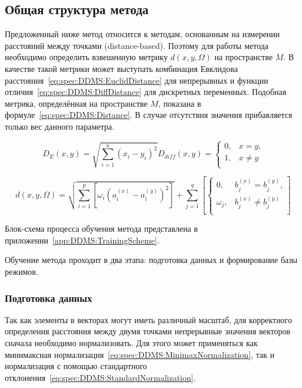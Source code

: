 \subsection{Общая структура метода}
Предложенный ниже метод относится к методам, основанным на измерении расстояний между точками (distance-based). Поэтому для работы метода необходимо определить взвешенную метрику $d(x,y,\Omega)$ на пространстве $M$. В качестве такой метрики может выступать комбинация Евклидова расстояния~\eqref{eq:spec:DDMS:EuclidDistance} для непрерывных и функции отличия~\eqref{eq:spec:DDMS:DiffDistance} для дискретных переменных. Подобная метрика, определённая на пространстве $M$, показана в формуле~\eqref{eq:spec:DDMS:Distance}. В случае отсутствия значения прибавляется только вес данного параметра.

\begin{subequations}
\begin{equation} \label{eq:spec:DDMS:EuclidDistance}
D_E(x,y) = \sqrt{\sum_{i=1}^{n} \left(x_i - y_i\right)^2}
\end{equation}
\begin{equation} \label{eq:spec:DDMS:DiffDistance}
D_{diff}(x,y) = 
\begin{cases} 
	0, & x=y \text{,} \\
	1, & x\neq y \\
\end{cases}
\end{equation}
\end{subequations}

\begin{equation} \label{eq:spec:DDMS:Distance}
d(x,y,\Omega) = \sqrt{\sum_{i=1}^{p} \left[\omega_i \left(a_i^{(x)} - a_i^{(y)}\right)^2\right]} + \sum_{j=1}^{q} 
\left[\begin{cases} 
	0, & b_j^{(x)}=b_j^{(y)} \text{,} \\
	\omega_j, & b_j^{(x)}\neq b_j^{(y)} \\
\end{cases}\right]
\end{equation}

Блок-схема процесса обучения метода представлена в приложении~\ref{app:DDMS:TrainingScheme}.

Обучение метода проходит в два этапа: подготовка данных и формирование базы режимов.

\subsubsection{Подготовка данных}
Так как элементы в векторах могут иметь различный масштаб, для корректного определения расстояния между двумя точками непрерывные значения векторов сначала необходимо нормализовать. Для этого может применяться как минимаксная нормализация~\eqref{eq:spec:DDMS:MinimaxNormalization}, так и нормализация с помощью стандартного отклонения~\eqref{eq:spec:DDMS:StandardNormalization}.

